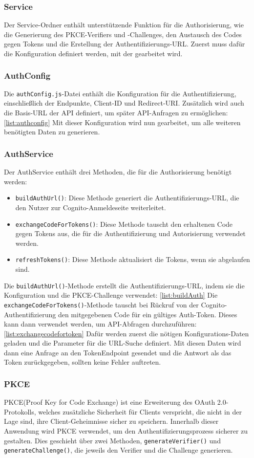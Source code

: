 \subsubsection{Service}    
Der Service-Ordner enthält unterstützende Funktion für die Authorisierung, wie die Generierung des PKCE-Verifiers 
und -Challenges, den Austausch des Codes gegen Tokens und die Erstellung der Authentifizierungs-URL.
Zuerst muss dafür die Konfiguration definiert werden, mit der gearbeitet wird.
\subsubsection{AuthConfig}
Die \texttt{authConfig.js}-Datei enthält die Konfiguration für die Authentifizierung, einschließlich der Endpunkte, Client-ID und Redirect-URI. 
Zusätzlich wird auch die Basis-URL der API definiert, um später API-Anfragen zu ermöglichen:\ref{list:authconfig}
Mit dieser Konfiguration wird nun gearbeitet, um alle weiteren benötigten Daten zu generieren.
\subsubsection{AuthService}
Der AuthService enthält drei Methoden, die für die Authorisierung benötigt werden:
\begin{itemize}
    \item \texttt{buildAuthUrl()}: Diese Methode generiert die Authentifizierungs-URL, die den Nutzer zur Cognito-Anmeldeseite weiterleitet.
    \item \texttt{exchangeCodeForTokens()}: Diese Methode tauscht den erhaltenen Code gegen Tokens aus, die für die Authentifizierung und Autorisierung verwendet werden.
    \item \texttt{refreshTokens()}: Diese Methode aktualisiert die Tokens, wenn sie abgelaufen sind.
\end{itemize}
Die \texttt{buildAuthUrl()}-Methode erstellt die Authentifizierungs-URL, indem sie die Konfiguration und die PKCE-Challenge verwendet: \ref{list:buildAuth}
Die \texttt{exchangeCodeForTokens()}-Methode tauscht bei Rückruf von der Cognito-Authentifizierung den mitgegebenen Code für ein gültiges
Auth-Token. Dieses kann dann verwendet werden, um API-Abfragen durchzuführen: \ref{list:exchangecodefortoken}
Dafür werden zuerst die nötigen Konfigurations-Daten geladen und die Parameter für die URL-Suche definiert. Mit diesen Daten wird dann 
eine Anfrage an den TokenEndpoint gesendet und die Antwort als das Token zurückgegeben, sollten keine Fehler auftreten.
\subsubsection{PKCE}
PKCE(Proof Key for Code Exchange) ist eine Erweiterung des OAuth 2.0-Protokolls, welches zusätzliche Sicherheit für Clients verspricht,
die nicht in der Lage sind, ihre Client-Geheimnisse sicher zu speichern.
Innerhalb dieser Anwendung wird PKCE verwendet, um den Authentifizierungsprozess sicherer zu gestalten. Dies geschieht über zwei Methoden,
\texttt{generateVerifier()} und \texttt{generateChallenge()}, die jeweils den Verifier und die Challenge generieren. \break

